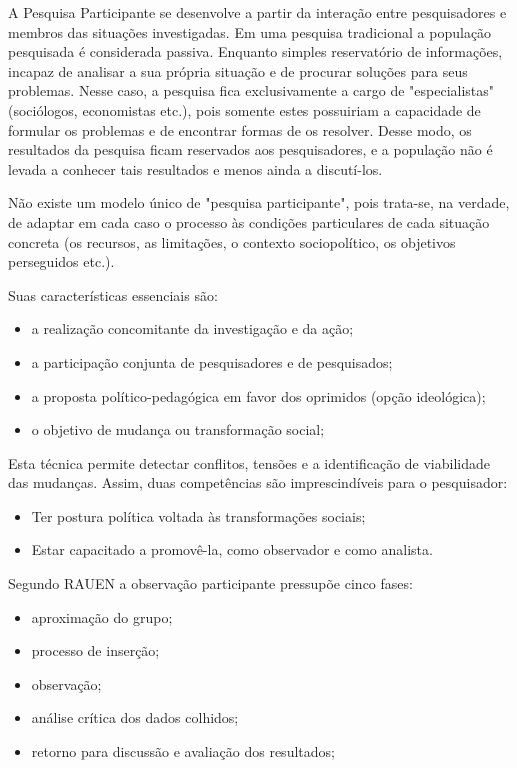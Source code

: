 A Pesquisa Participante se desenvolve a partir da interação entre pesquisadores e membros das situações investigadas. Em uma pesquisa tradicional a população pesquisada é considerada passiva. Enquanto simples reservatório de informações, incapaz de analisar a sua própria situação e de procurar soluções para seus problemas. Nesse  caso, a pesquisa fica exclusivamente a cargo de "especialistas" (sociólogos, economistas etc.), pois somente estes possuiriam a capacidade de formular os problemas e de encontrar formas de os resolver. Desse modo, os resultados da pesquisa ficam reservados aos pesquisadores, e a  população não é levada a conhecer tais resultados e menos ainda a discutí-los.

Não existe um modelo único de "pesquisa participante", pois trata-se, na verdade, de adaptar em cada caso o processo às condições particulares de cada situação concreta (os recursos, as limitações, o contexto sociopolítico, os objetivos perseguidos etc.).

Suas características essenciais são:

\begin{itemize}
	\item a realização concomitante da investigação e da ação;
	\item a participação conjunta de pesquisadores e de pesquisados;
	\item a proposta político-pedagógica em favor dos oprimidos (opção ideológica);
	\item o objetivo de mudança ou transformação social;
\end{itemize}

Esta técnica permite detectar conflitos, tensões e a identificação de viabilidade das mudanças. Assim, duas competências são imprescindíveis para o pesquisador:

\begin{itemize}
	\item Ter postura política voltada às transformações sociais; 
	\item Estar capacitado a promovê-la, como observador e como analista.
\end{itemize}

Segundo RAUEN a observação participante pressupõe cinco fases:

\begin{itemize}
	\item aproximação do grupo;
	\item processo de inserção;
	\item observação;
	\item análise crítica dos dados colhidos;
	\item retorno para discussão e avaliação dos resultados;
\end{itemize}

